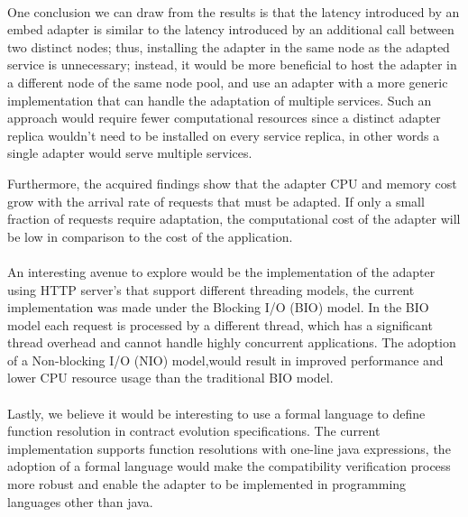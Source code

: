 \paragraph{}

One conclusion we can draw from the results is that the latency introduced by an embed adapter is similar to the latency introduced by an additional call between two distinct nodes;
thus, installing the adapter in the same node as the adapted service is unnecessary;
instead, it would be more beneficial to host the adapter in a different node of the same node pool, and use an adapter with a more generic implementation that can handle the adaptation of multiple services.
Such an approach would require fewer computational resources since a distinct adapter replica wouldn't need to be installed on every service replica, in other words a single adapter would serve multiple services.

Furthermore, the acquired findings show that the adapter CPU and memory cost grow with the arrival rate of requests that must be adapted.
If only a small fraction of requests require adaptation, the computational cost of the adapter will be low in comparison to the cost of the application.

\paragraph{}

An interesting avenue to explore would be the implementation of the adapter using HTTP server's that support different threading models, the current implementation
was made under the Blocking I/O (BIO) model.
In the BIO model each request is processed by a different thread, which has a significant thread overhead and cannot handle highly concurrent applications.
The adoption of a Non-blocking I/O (NIO) model,would result in improved performance and lower CPU resource usage than the traditional BIO model.

\paragraph{}

Lastly, we believe it would be interesting to use a formal language to define function resolution in contract evolution specifications.
The current implementation supports function resolutions with one-line java expressions,
the adoption of a formal language would make the compatibility verification process more robust and enable the adapter to be implemented in programming languages other than java.


